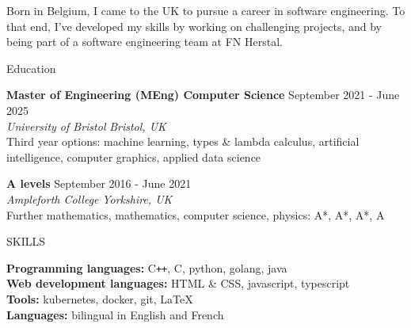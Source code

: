 \documentclass{resume} %
\begin{document}


{Born in Belgium, I came to the UK to pursue a career in software engineering. To that end, I've developed my skills by working on challenging projects, and by being part of a software engineering team at FN Herstal.}



\begin{rSection}{Education}

{\bf Master of Engineering (MEng) Computer Science} \hfill {September 2021 - June 2025} \\
\textit{University of Bristol} \hfill \textit{Bristol, UK} \\
Third year options: machine learning, types \& lambda calculus, artificial intelligence, computer graphics, applied data science

{\bf A levels} \hfill {September 2016 - June 2021} \\
\textit{Ampleforth College} \hfill \textit{Yorkshire, UK} \\
Further mathematics, mathematics, computer science, physics: A*, A*, A*, A

\end{rSection}

\begin{rSection}{SKILLS}

{\bf Programming languages:} C\texttt{++}, C, python, golang, java \\
{\bf Web development languages:} HTML \& CSS, javascript, typescript \\
{\bf Tools:} kubernetes, docker, git, LaTeX \\
{\bf Languages:} bilingual in English and French

\end{rSection}
\end{document}
